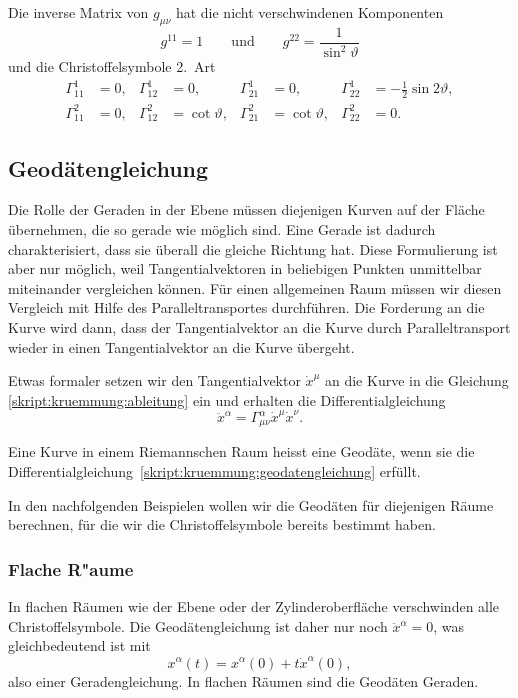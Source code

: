 Die inverse Matrix von $g_{\mu\nu}$ hat die nicht verschwindenen
Komponenten
\[
g^{11} = 1
\qquad\text{und}\qquad
g^{22} = \frac1{\sin^2\vartheta}
\]
und die Christoffelsymbole 2.~Art
\begin{equation}
\begin{aligned}
 \Gamma_{11}^1
&=0,
&\Gamma_{12}^1
&=0,
&\Gamma_{21}^1
&=0,
&\Gamma_{22}^1
&=-\frac12\sin2\vartheta,
\\
 \Gamma_{11}^2
&=0,
&\Gamma_{12}^2
&=\cot\vartheta,
&\Gamma_{21}^2
&=\cot\vartheta,
&\Gamma_{22}^2
&=0.
\end{aligned}
\label{skript:kruemmung:christoffelkugel}
\end{equation}

\subsection{Geodätengleichung}
Die Rolle der Geraden in der Ebene müssen diejenigen Kurven auf der
Fläche übernehmen, die so gerade wie möglich sind. 
Eine Gerade ist dadurch charakterisiert, dass sie überall die gleiche
Richtung hat. 
Diese Formulierung ist aber nur möglich, weil Tangentialvektoren in
beliebigen Punkten unmittelbar miteinander vergleichen können.
Für einen allgemeinen Raum müssen wir diesen Vergleich mit Hilfe
des Paralleltransportes durchführen.
Die Forderung an die Kurve wird dann, dass der Tangentialvektor
an die Kurve durch Paralleltransport wieder in einen Tangentialvektor
an die Kurve übergeht.

Etwas formaler setzen wir den Tangentialvektor $\dot x^\mu$ an die
Kurve in die Gleichung \eqref{skript:kruemmung:ableitung} ein und
erhalten die Differentialgleichung 
\begin{equation}
\ddot x^\alpha=\Gamma_{\mu\nu}^\alpha \dot x^\mu\dot x^\nu.
\label{skript:kruemmung:geodatengleichung}
\end{equation}

\begin{definition}
Eine Kurve in einem Riemannschen Raum heisst eine Geodäte, wenn sie
die Differentialgleichung~\eqref{skript:kruemmung:geodatengleichung}
erfüllt.
\end{definition}

In den nachfolgenden Beispielen wollen wir die Geodäten für diejenigen
Räume berechnen, für die wir die Christoffelsymbole bereits bestimmt
haben.

%
%

\subsubsection{Flache R"aume}
In flachen Räumen wie der Ebene oder der Zylinderoberfläche verschwinden
alle Christoffelsymbole.
Die Geodätengleichung ist daher nur noch
$\ddot x^\alpha=0$, was gleichbedeutend ist mit
\[
x^\alpha(t)=x^\alpha(0) + t \dot x^\alpha(0),
\]
also einer Geradengleichung.
In flachen Räumen sind die Geodäten Geraden.

